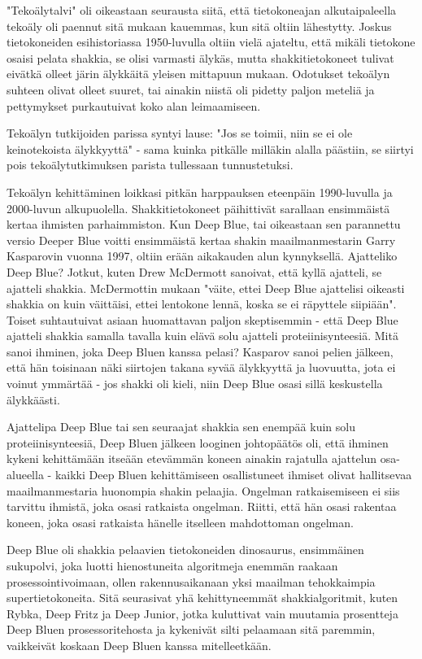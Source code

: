 "Tekoälytalvi" oli oikeastaan seurausta siitä, että tietokoneajan alkutaipaleella tekoäly oli paennut sitä mukaan kauemmas, kun sitä oltiin lähestytty. Joskus tietokoneiden esihistoriassa 1950-luvulla oltiin vielä ajateltu, että mikäli tietokone osaisi pelata shakkia, se olisi varmasti älykäs, mutta shakkitietokoneet tulivat eivätkä olleet järin älykkäitä yleisen mittapuun mukaan. Odotukset tekoälyn suhteen olivat olleet suuret, tai ainakin niistä oli pidetty paljon meteliä ja pettymykset purkautuivat koko alan leimaamiseen.


Tekoälyn tutkijoiden parissa syntyi lause: "Jos se toimii, niin se ei ole keinotekoista älykkyyttä" - sama kuinka pitkälle milläkin alalla päästiin, se siirtyi pois tekoälytutkimuksen parista tullessaan tunnustetuksi.


Tekoälyn kehittäminen loikkasi pitkän harppauksen eteenpäin 1990-luvulla ja 2000-luvun alkupuolella. Shakkitietokoneet päihittivät sarallaan ensimmäistä kertaa ihmisten parhaimmiston. Kun Deep Blue, tai oikeastaan sen parannettu versio Deeper Blue voitti ensimmäistä kertaa shakin maailmanmestarin Garry Kasparovin vuonna 1997, oltiin erään aikakauden alun kynnyksellä. Ajatteliko Deep Blue? Jotkut, kuten Drew McDermott sanoivat, että kyllä ajatteli, se ajatteli shakkia. McDermottin mukaan "väite, ettei Deep Blue ajattelisi oikeasti shakkia on kuin väittäisi, ettei lentokone lennä, koska se ei räpyttele siipiään". Toiset suhtautuivat asiaan huomattavan paljon skeptisemmin - että Deep Blue ajatteli shakkia samalla tavalla kuin elävä solu ajatteli proteiinisynteesiä. Mitä sanoi ihminen, joka Deep Bluen kanssa pelasi? Kasparov sanoi pelien jälkeen, että hän toisinaan näki siirtojen takana syvää älykkyyttä ja luovuutta, jota ei voinut ymmärtää - jos shakki oli kieli, niin Deep Blue osasi sillä keskustella älykkäästi.


Ajattelipa Deep Blue tai sen seuraajat shakkia sen enempää kuin solu proteiinisynteesiä, Deep Bluen jälkeen looginen johtopäätös oli, että ihminen kykeni kehittämään itseään etevämmän koneen ainakin rajatulla ajattelun osa-alueella - kaikki Deep Bluen kehittämiseen osallistuneet ihmiset olivat hallitsevaa maailmanmestaria huonompia shakin pelaajia. Ongelman ratkaisemiseen ei siis tarvittu ihmistä, joka osasi ratkaista ongelman. Riitti, että hän osasi rakentaa koneen, joka osasi ratkaista hänelle itselleen mahdottoman ongelman.


Deep Blue oli shakkia pelaavien tietokoneiden dinosaurus, ensimmäinen sukupolvi, joka luotti hienostuneita algoritmeja enemmän raakaan prosessointivoimaan, ollen rakennusaikanaan yksi maailman tehokkaimpia supertietokoneita. Sitä seurasivat yhä kehittyneemmät shakkialgoritmit, kuten Rybka, Deep Fritz ja Deep Junior, jotka kuluttivat vain muutamia prosentteja Deep Bluen prosessoritehosta ja kykenivät silti pelaamaan sitä paremmin, vaikkeivät koskaan Deep Bluen kanssa mitelleetkään.


